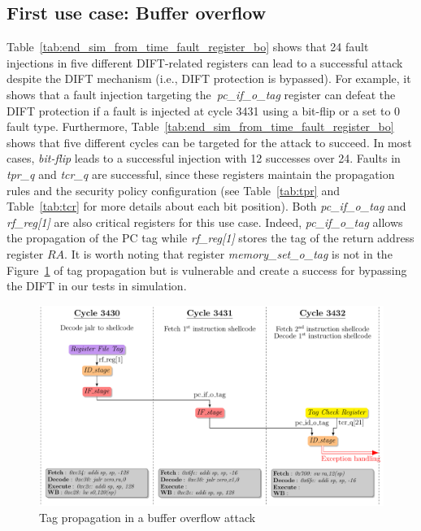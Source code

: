 \subsection{First use case: Buffer overflow}
Table~\ref{tab:end_sim_from_time_fault_register_bo} shows that 24 fault injections in five different DIFT-related registers can lead to a successful attack despite the DIFT mechanism (i.e., DIFT protection is bypassed). 
For example, it shows that a fault injection targeting the~\textit{pc\_if\_o\_tag} register can defeat the DIFT protection if a fault is injected at cycle 3431 using a bit-flip or a set to 0 fault type.
Furthermore, Table~\ref{tab:end_sim_from_time_fault_register_bo} shows that five different cycles can be targeted for the attack to succeed. In most cases, \textit{bit-flip} leads to a successful injection with 12 successes over 24. Faults in \textit{tpr\_q} and \textit{tcr\_q} are successful, since these registers maintain the propagation rules and the security policy configuration (see Table~\ref{tab:tpr} and Table~\ref{tab:tcr} for more details about each bit position). Both \textit{pc\_if\_o\_tag} and \textit{rf\_reg[1]} are also critical registers for this use case. Indeed, \textit{pc\_if\_o\_tag} allows the propagation of the PC tag while \textit{rf\_reg[1]} stores the tag of the return address register $RA$. It is worth noting that register \textit{memory\_set\_o\_tag} is not in the Figure~\ref{fig:study_buffer_overflow_tag_propagation} of tag propagation but is vulnerable and create a success for bypassing the DIFT in our tests in simulation.

\begin{figure}[ht]
    \centering
    \includegraphics[width=\textwidth]{c3_vulnerabilities_assessment/img/buffer_overflow/bufferOverflowAttack_short.pdf}
    \caption{Tag propagation in a buffer overflow attack}
    \label{fig:study_buffer_overflow_tag_propagation}
\end{figure}

